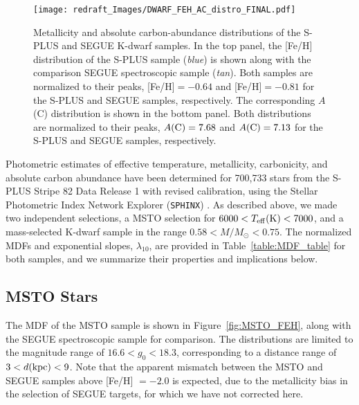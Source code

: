 \documentclass[twocolumn,trackchanges]{aastex63}
\begin{document}
\begin{figure}
	\centering
	\texttt{[image: redraft\_Images/DWARF\_FEH\_AC\_distro\_FINAL.pdf]}
	
	\caption{Metallicity and absolute carbon-abundance distributions of the S-PLUS and SEGUE K-dwarf samples. In the top panel, the [Fe/H] distribution of the S-PLUS sample (\textit{blue}) is shown along with the comparison SEGUE spectroscopic sample (\textit{tan}). Both samples are normalized to their peaks, [Fe/H]$=-0.64$ and [Fe/H]$=-0.81$ for the S-PLUS and SEGUE samples, respectively. The corresponding $A$(C) distribution is shown in the bottom panel. Both distributions are normalized to their peaks, $A({\rm C}) = 7.68$ and $A({\rm C}) = 7.13$ for the S-PLUS and SEGUE samples, respectively. \label{fig:dwarf_mdf}}
\end{figure}




Photometric estimates of effective temperature, metallicity, carbonicity, and absolute carbon abundance have been determined for 700,733 stars from the S-PLUS Stripe 82 Data Release 1 with revised calibration, using the Stellar Photometric Index Network Explorer (\texttt{SPHINX}) \citep{Whitten:2019a}. As described above, we made two independent selections, a MSTO selection for $6000 < T_{\rm eff} \textrm{(K)} < 7000$, and a mass-selected K-dwarf sample in the range $0.58 < M/M_{\odot} < 0.75$. 
The normalized MDFs and exponential slopes, $\lambda_{10}$, are provided in Table~\ref{table:MDF_table} for both samples, and we summarize their properties and implications below.


\subsection{MSTO Stars}\label{section:MSTO_results}

The MDF of the MSTO sample is shown in Figure~\ref{fig:MSTO_FEH}, along with the SEGUE spectroscopic sample for comparison. The distributions are limited to the magnitude range of $16.6 < g_0 <18.3$, corresponding to a distance range of $3 < d (\rm{kpc}) < 9$. Note that the apparent mismatch between the MSTO and SEGUE samples above [Fe/H] $= -2.0$ is expected, due to the metallicity bias in the selection of SEGUE targets, for which we have not corrected here.
\end{document}
